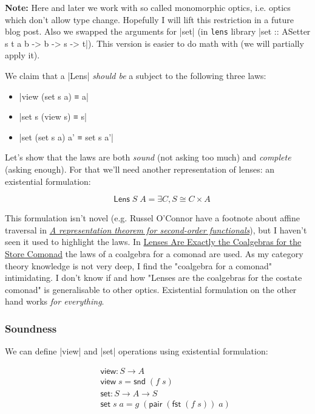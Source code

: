 \documentclass{article}
\begin{document}
\textbf{Note:} Here and later we work with so called monomorphic optics,
i.e. optics which don't allow type change.
Hopefully I will lift this restriction in a future blog post.
Also we swapped the arguments for |set|
(in \texttt{lens} library |set :: ASetter s t a b -> b -> s -> t|).
This version is easier to do math with
(we will partially apply it).

We claim that a |Lens| \emph{should be} a subject to the following three laws:

\begin{itemize}
\item |view (set s a) ≡ a|
\item |set s (view s) ≡ s|
\item |set (set s a) a' ≡ set s a'|
\end{itemize}

Let's show that the laws are both \emph{sound} (not asking too much)
and \emph{complete} (asking enough). For that we'll need another representation
of lenses: an existential formulation:

\begin{equation}
\quad \mathsf{Lens}\;S\;A = \exists C, S \cong C \times A
\end{equation}

This formulation isn't novel (e.g. Russel O'Connor have a footnote about affine traversal in
\href{https://www.cambridge.org/core/journals/journal-of-functional-programming/article/representation-theorem-for-secondorder-functionals/4B782B0BB6EB53E53935D7A0F8432E8E}{\emph{A representation theorem for second-order functionals}}),
but I haven't seen it used to highlight the laws.
In \href{https://r6research.livejournal.com/23705.html}{Lenses Are Exactly the Coalgebras for the Store Comonad}
the laws of a coalgebra for a comonad are used.
As my category theory knowledge is not very deep, I find the "coalgebra for a comonad" intimidating.
I don't know if and how "Lenses are the coalgebras for the costate comonad" is generalisable to other optics.
Existential formulation on the other hand works \emph{for everything}.

\subsubsection{Soundness}

We can define |view| and |set| operations using existential formulation:

\begin{equation}
\begin{aligned}
\quad &\mathsf{view} : S \to A \\
      &\mathsf{view}\;s   = \mathsf{snd}\; (f\;s) \\
      &\mathsf{set} : S \to A \to S \\
      &\mathsf{set}\;s\;a = g\; (\mathsf{pair}\;(\mathsf{fst}\;(f\;s))\;a)
\end{aligned}
\end{equation}
\end{document}
